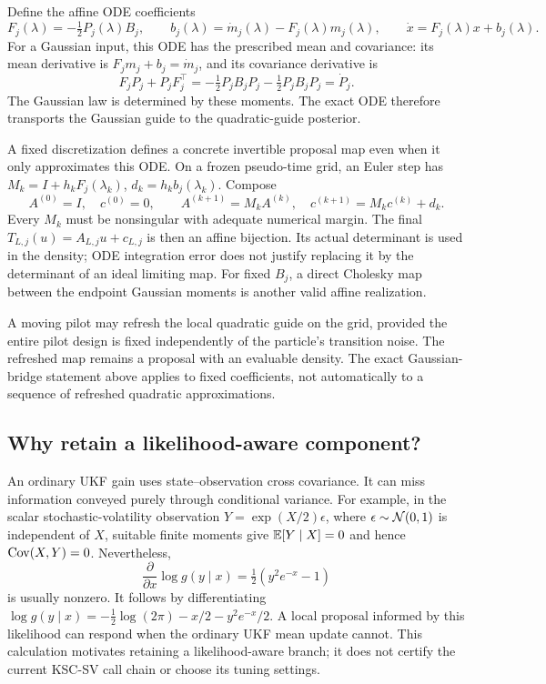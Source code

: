 Define the affine ODE coefficients
\begin{equation}
\label{eq:bf-covariance-proposal-local-ode}
 F_j(\lambda)=-\tfrac12P_j(\lambda)B_j,\qquad
 b_j(\lambda)=\dot m_j(\lambda)-F_j(\lambda)m_j(\lambda),
 \qquad \dot x=F_j(\lambda)x+b_j(\lambda).
\end{equation}
For a Gaussian input, this ODE has the prescribed mean and covariance:
its mean derivative is \(F_jm_j+b_j=\dot m_j\), and its covariance
derivative is
\[
 F_jP_j+P_jF_j^\top
 =-\tfrac12P_jB_jP_j-\tfrac12P_jB_jP_j
 =\dot P_j .
\]
The Gaussian law is determined by these moments. The exact ODE therefore
transports the Gaussian guide to the quadratic-guide posterior.

A fixed discretization defines a concrete invertible proposal map even
when it only approximates this ODE. On a frozen pseudo-time grid, an Euler
step has \(M_k=I+h_kF_j(\lambda_k)\), \(d_k=h_kb_j(\lambda_k)\).
Compose
\begin{equation}
\label{eq:bf-covariance-proposal-affine-composition}
 A^{(0)}=I,\quad c^{(0)}=0,\qquad
 A^{(k+1)}=M_kA^{(k)},\quad
 c^{(k+1)}=M_kc^{(k)}+d_k .
\end{equation}
Every \(M_k\) must be nonsingular with adequate numerical margin.
The final \(T_{L,j}(u)=A_{L,j}u+c_{L,j}\) is then an affine bijection.
Its actual determinant is used in the density; ODE integration error
does not justify replacing it by the determinant of an ideal limiting map.
For fixed \(B_j\), a direct Cholesky map between the endpoint Gaussian
moments is another valid affine realization.

A moving pilot may refresh the local quadratic guide on the grid, provided
the entire pilot design is fixed independently of the particle's transition
noise. The refreshed map remains a proposal with an evaluable density.
The exact Gaussian-bridge statement above applies to fixed coefficients,
not automatically to a sequence of refreshed quadratic approximations.

\subsection{Why retain a likelihood-aware component?}

An ordinary UKF gain uses state--observation cross covariance. It can miss
information conveyed purely through conditional variance. For example, in
the scalar stochastic-volatility observation
\(Y=\exp(X/2)\epsilon\), where \(\epsilon\sim\mathcal N(0,1)\) is independent
of \(X\), suitable finite moments give
\(\mathbb E[Y\mid X]=0\) and hence \(\operatorname{Cov}(X,Y)=0\).
Nevertheless,
\begin{equation}
\label{eq:bf-covariance-proposal-sv-score}
 \frac{\partial}{\partial x}\log g(y\mid x)
 =\tfrac12(y^2e^{-x}-1)
\end{equation}
is usually nonzero. It follows by differentiating
\(\log g(y\mid x)=-\tfrac12\log(2\pi)-x/2-y^2e^{-x}/2\).
A local proposal informed by this likelihood can respond when the
ordinary UKF mean update cannot. This calculation motivates retaining a
likelihood-aware branch; it does not certify the current KSC-SV call chain
or choose its tuning settings.

